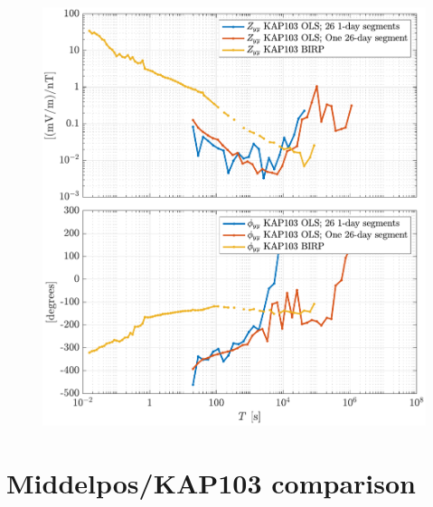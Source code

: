 \documentclass{article}
\begin{document}
\begin{figure}[h!]
\centering
\includegraphics[width=\textwidth]{figures/KAP103/transferfnZ_compare-Z_yy_Magnitude_Phase.pdf}
\caption{}
\label{fig:universe}
\end{figure}

\clearpage

\section{Middelpos/KAP103 comparison}
\end{document}
